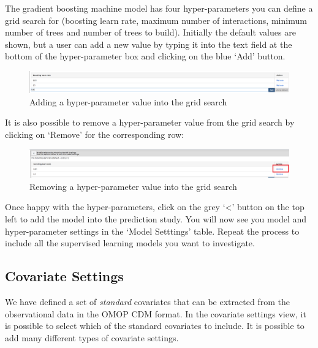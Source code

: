 \documentclass[11pt]{book}
\theoremstyle{definition}
\theoremstyle{definition}
\theoremstyle{definition}
\theoremstyle{remark}
\begin{document}
The gradient boosting machine model has four hyper-parameters you can define a grid search for (boosting learn rate, maximum number of interactions, minimum number of trees and number of trees to build). Initially the default values are shown, but a user can add a new value by typing it into the text field at the bottom of the hyper-parameter box and clicking on the blue `Add' button.\\

\begin{figure}
\includegraphics[width=1\linewidth]{images/PatientLevelPrediction/atlasImplementation/analysis_adding_hyper} \caption{Adding a hyper-parameter value into the grid search}\label{fig:figureAS6}
\end{figure}

It is also possible to remove a hyper-parameter value from the grid search by clicking on `Remove' for the corresponding row:

\begin{figure}
\includegraphics[width=1\linewidth]{images/PatientLevelPrediction/atlasImplementation/analysis_removing_hyper} \caption{Removing a hyper-parameter value into the grid search}\label{fig:figureAS7}
\end{figure}

Once happy with the hyper-parameters, click on the grey `\textless{}' button on the top left to add the model into the prediction study. You will now see you model and hyper-parameter settings in the `Model Setttings' table. Repeat the process to include all the supervised learning models you want to investigate.

\hypertarget{covariate-settings}{%
\subsection{Covariate Settings}\label{covariate-settings}}

We have defined a set of \emph{standard} covariates that can be extracted from the observational data in the OMOP CDM format. In the covariate settings view, it is possible to select which of the standard covariates to include. It is possible to add many different types of covariate settings.
\end{document}
